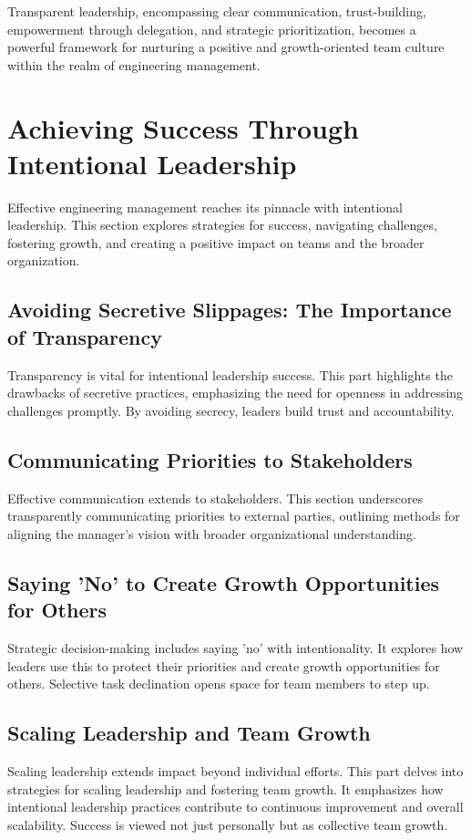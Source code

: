 \documentclass[10pt]{article}
\begin{document}
Transparent leadership, encompassing clear communication, trust-building, empowerment through delegation, and strategic prioritization, becomes a powerful framework for nurturing a positive and growth-oriented team culture within the realm of engineering management.


\section{Achieving Success Through Intentional Leadership}
Effective engineering management reaches its pinnacle with intentional leadership. This section explores strategies for success, navigating challenges, fostering growth, and creating a positive impact on teams and the broader organization.

\subsection{Avoiding Secretive Slippages: The Importance of Transparency} 
Transparency is vital for intentional leadership success. This part highlights the drawbacks of secretive practices, emphasizing the need for openness in addressing challenges promptly. By avoiding secrecy, leaders build trust and accountability.

\subsection{Communicating Priorities to Stakeholders} 
Effective communication extends to stakeholders. This section underscores transparently communicating priorities to external parties, outlining methods for aligning the manager’s vision with broader organizational understanding.

\subsection{Saying 'No' to Create Growth Opportunities for Others} 
Strategic decision-making includes saying 'no' with intentionality. It explores how leaders use this to protect their priorities and create growth opportunities for others. Selective task declination opens space for team members to step up.

\subsection{Scaling Leadership and Team Growth} 
Scaling leadership extends impact beyond individual efforts. This part delves into strategies for scaling leadership and fostering team growth. It emphasizes how intentional leadership practices contribute to continuous improvement and overall scalability. Success is viewed not just personally but as collective team growth.
\end{document}
